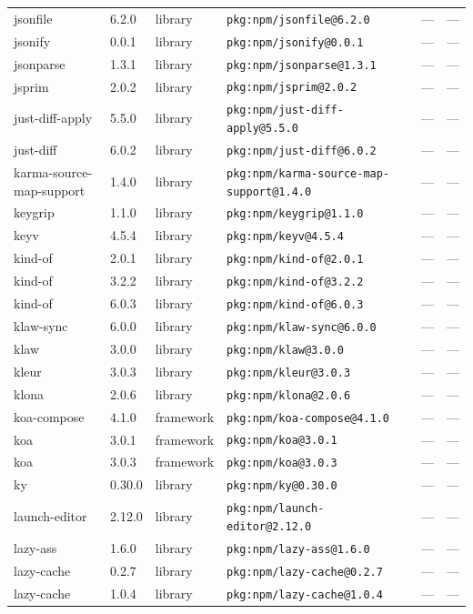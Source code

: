 \documentclass[11pt]{article}
\begin{document}
\begin{longtable}{|l|l|l|p{2.2cm}|l|p{4cm}|}
jsonfile & 6.2.0 & library & \texttt{pkg:npm/jsonfile@6.2.0} & — & — \\
jsonify & 0.0.1 & library & \texttt{pkg:npm/jsonify@0.0.1} & — & — \\
jsonparse & 1.3.1 & library & \texttt{pkg:npm/jsonparse@1.3.1} & — & — \\
jsprim & 2.0.2 & library & \texttt{pkg:npm/jsprim@2.0.2} & — & — \\
just-diff-apply & 5.5.0 & library & \texttt{pkg:npm/just-diff-apply@5.5.0} & — & — \\
just-diff & 6.0.2 & library & \texttt{pkg:npm/just-diff@6.0.2} & — & — \\
karma-source-map-support & 1.4.0 & library & \texttt{pkg:npm/karma-source-map-support@1.4.0} & — & — \\
keygrip & 1.1.0 & library & \texttt{pkg:npm/keygrip@1.1.0} & — & — \\
keyv & 4.5.4 & library & \texttt{pkg:npm/keyv@4.5.4} & — & — \\
kind-of & 2.0.1 & library & \texttt{pkg:npm/kind-of@2.0.1} & — & — \\
kind-of & 3.2.2 & library & \texttt{pkg:npm/kind-of@3.2.2} & — & — \\
kind-of & 6.0.3 & library & \texttt{pkg:npm/kind-of@6.0.3} & — & — \\
klaw-sync & 6.0.0 & library & \texttt{pkg:npm/klaw-sync@6.0.0} & — & — \\
klaw & 3.0.0 & library & \texttt{pkg:npm/klaw@3.0.0} & — & — \\
kleur & 3.0.3 & library & \texttt{pkg:npm/kleur@3.0.3} & — & — \\
klona & 2.0.6 & library & \texttt{pkg:npm/klona@2.0.6} & — & — \\
koa-compose & 4.1.0 & framework & \texttt{pkg:npm/koa-compose@4.1.0} & — & — \\
koa & 3.0.1 & framework & \texttt{pkg:npm/koa@3.0.1} & — & — \\
koa & 3.0.3 & framework & \texttt{pkg:npm/koa@3.0.3} & — & — \\
ky & 0.30.0 & library & \texttt{pkg:npm/ky@0.30.0} & — & — \\
launch-editor & 2.12.0 & library & \texttt{pkg:npm/launch-editor@2.12.0} & — & — \\
lazy-ass & 1.6.0 & library & \texttt{pkg:npm/lazy-ass@1.6.0} & — & — \\
lazy-cache & 0.2.7 & library & \texttt{pkg:npm/lazy-cache@0.2.7} & — & — \\
lazy-cache & 1.0.4 & library & \texttt{pkg:npm/lazy-cache@1.0.4} & — & — \\

\end{longtable}
\end{document}
